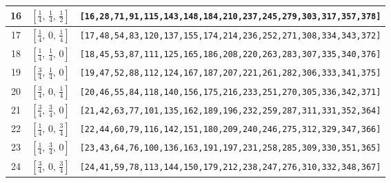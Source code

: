 \documentclass[fleqn,8pt]{jsarticle}
\begin{document}
\begin{longtable}{ccc}
16 & $\left[ \frac{1}{4},\, \frac{1}{4},\, \frac{1}{2} \right]$ & {\tt [16,28,71,91,115,143,148,184,210,237,245,279,303,317,357,378]} \\ \hline
17 & $\left[ \frac{1}{4},\, 0,\, \frac{1}{4} \right]$ & {\tt [17,48,54,83,120,137,155,174,214,236,252,271,308,334,343,372]} \\ \hline
18 & $\left[ \frac{1}{4},\, \frac{1}{4},\, 0 \right]$ & {\tt [18,45,53,87,111,125,165,186,208,220,263,283,307,335,340,376]} \\ \hline
19 & $\left[ \frac{3}{4},\, \frac{1}{4},\, 0 \right]$ & {\tt [19,47,52,88,112,124,167,187,207,221,261,282,306,333,341,375]} \\ \hline
20 & $\left[ \frac{3}{4},\, 0,\, \frac{1}{4} \right]$ & {\tt [20,46,55,84,118,140,156,175,216,233,251,270,305,336,342,371]} \\ \hline
21 & $\left[ \frac{3}{4},\, \frac{3}{4},\, 0 \right]$ & {\tt [21,42,63,77,101,135,162,189,196,232,259,287,311,331,352,364]} \\ \hline
22 & $\left[ \frac{1}{4},\, 0,\, \frac{3}{4} \right]$ & {\tt [22,44,60,79,116,142,151,180,209,240,246,275,312,329,347,366]} \\ \hline
23 & $\left[ \frac{1}{4},\, \frac{3}{4},\, 0 \right]$ & {\tt [23,43,64,76,100,136,163,191,197,231,258,285,309,330,351,365]} \\ \hline
24 & $\left[ \frac{3}{4},\, 0,\, \frac{3}{4} \right]$ & {\tt [24,41,59,78,113,144,150,179,212,238,247,276,310,332,348,367]} \\
\end{longtable}
\renewcommand{\arraystretch}{1.2}
\end{document}
